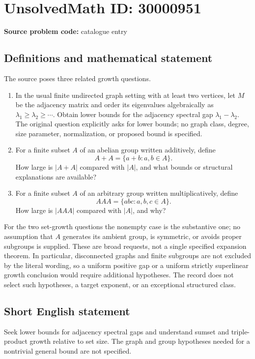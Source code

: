 \documentclass[11pt]{article}
\begin{document}
\section*{UnsolvedMath ID: 30000951}
\textbf{Source problem code:} catalogue entry
\subsection{Definitions and mathematical statement}
The source poses three related growth questions.
\begin{enumerate}
\item In the usual finite undirected graph setting with at least two vertices, let \(M\) be the adjacency matrix and order its eigenvalues algebraically as \(\lambda_1\geq\lambda_2\geq\cdots\). Obtain lower bounds for the adjacency spectral gap \(\lambda_1-\lambda_2\). The original question explicitly asks for lower bounds; no graph class, degree, size parameter, normalization, or proposed bound is specified.
\item For a finite subset \(A\) of an abelian group written additively, define
\[
A+A=\{a+b:a,b\in A\}.
\]
How large is \(|A+A|\) compared with \(|A|\), and what bounds or structural explanations are available?
\item For a finite subset \(A\) of an arbitrary group written multiplicatively, define
\[
AAA=\{abc:a,b,c\in A\}.
\]
How large is \(|AAA|\) compared with \(|A|\), and why?
\end{enumerate}
For the two set-growth questions the nonempty case is the substantive one; no assumption that \(A\) generates its ambient group, is symmetric, or avoids proper subgroups is supplied. These are broad requests, not a single specified expansion theorem. In particular, disconnected graphs and finite subgroups are not excluded by the literal wording, so a uniform positive gap or a uniform strictly superlinear growth conclusion would require additional hypotheses. The record does not select such hypotheses, a target exponent, or an exceptional structured class.
\subsection{Short English statement}
Seek lower bounds for adjacency spectral gaps and understand sumset and triple-product growth relative to set size. The graph and group hypotheses needed for a nontrivial general bound are not specified.
\end{document}
